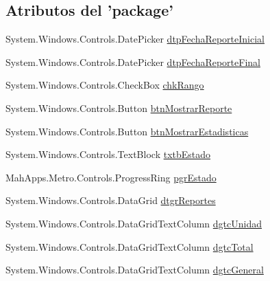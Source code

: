 \subsection*{Atributos del 'package'}
\begin{DoxyCompactItemize}
\item 
System.\-Windows.\-Controls.\-Date\-Picker \hyperlink{class_proyecto___integrador__3_1_1_reportes_1_1_reporte_por_unidad_ae873ad56bdb71282a4f246afd25c73df}{dtp\-Fecha\-Reporte\-Inicial}
\item 
System.\-Windows.\-Controls.\-Date\-Picker \hyperlink{class_proyecto___integrador__3_1_1_reportes_1_1_reporte_por_unidad_a2a25d23876d85745237deba7770064b0}{dtp\-Fecha\-Reporte\-Final}
\item 
System.\-Windows.\-Controls.\-Check\-Box \hyperlink{class_proyecto___integrador__3_1_1_reportes_1_1_reporte_por_unidad_afb84372486a7d0d6f22fd112a32c8f53}{chk\-Rango}
\item 
System.\-Windows.\-Controls.\-Button \hyperlink{class_proyecto___integrador__3_1_1_reportes_1_1_reporte_por_unidad_ad0b9b983d747f48216a4fb116f80a3d6}{btn\-Mostrar\-Reporte}
\item 
System.\-Windows.\-Controls.\-Button \hyperlink{class_proyecto___integrador__3_1_1_reportes_1_1_reporte_por_unidad_a94105030b4216f4d35e4e26fe90de49e}{btn\-Mostrar\-Estadisticas}
\item 
System.\-Windows.\-Controls.\-Text\-Block \hyperlink{class_proyecto___integrador__3_1_1_reportes_1_1_reporte_por_unidad_ab7c8420e279514d7fcf295a15f77c9d4}{txtb\-Estado}
\item 
Mah\-Apps.\-Metro.\-Controls.\-Progress\-Ring \hyperlink{class_proyecto___integrador__3_1_1_reportes_1_1_reporte_por_unidad_a1e0261a71157bdd7f6ab2c704005fc25}{pgr\-Estado}
\item 
System.\-Windows.\-Controls.\-Data\-Grid \hyperlink{class_proyecto___integrador__3_1_1_reportes_1_1_reporte_por_unidad_ac4501015e077f29cb4a26566d9debe50}{dtgr\-Reportes}
\item 
System.\-Windows.\-Controls.\-Data\-Grid\-Text\-Column \hyperlink{class_proyecto___integrador__3_1_1_reportes_1_1_reporte_por_unidad_ad4cc063b8f6a657a37503bdb747f45ea}{dgtc\-Unidad}
\item 
System.\-Windows.\-Controls.\-Data\-Grid\-Text\-Column \hyperlink{class_proyecto___integrador__3_1_1_reportes_1_1_reporte_por_unidad_abcccd0f8af50c0d2a94f8ec2030b237f}{dgtc\-Total}
\item 
System.\-Windows.\-Controls.\-Data\-Grid\-Text\-Column \hyperlink{class_proyecto___integrador__3_1_1_reportes_1_1_reporte_por_unidad_a0f1d6ffbdedd1cb3d884f4a9468e6da4}{dgtc\-General}

\end{DoxyCompactItemize}
